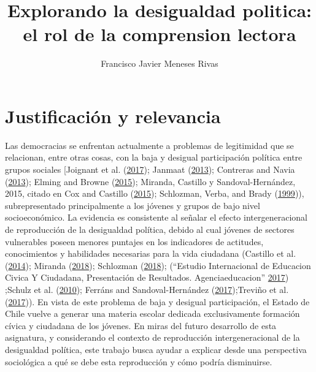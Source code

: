 \documentclass[
]{article}
\title{Explorando la desigualdad politica: el rol de la comprension lectora}
\author{Francisco Javier Meneses Rivas}
\date{}
\begin{document}
\maketitle

\hypertarget{justificaciuxf3n-y-relevancia}{%
\section{Justificación y
relevancia}\label{justificaciuxf3n-y-relevancia}}

Las democracias se enfrentan actualmente a problemas de legitimidad que
se relacionan, entre otras cosas, con la baja y desigual participación
política entre grupos sociales {[}Joignant et al.
(\protect\hyperlink{ref-joignantDesigualdadesVozPolitica2017}{2017});
Janmaat (\protect\hyperlink{ref-janmaatCivicCompetences2013}{2013});
Contreras and Navia
(\protect\hyperlink{ref-contrerasDIFERENCIASGENERACIONALESPARTICIPACION2013}{2013});
Elming and Browne
(\protect\hyperlink{ref-elmingEffectCoalitionTax2015}{2015}); Miranda,
Castillo y Sandoval-Hernández, 2015, citado en Cox and Castillo
(\protect\hyperlink{ref-coxAprendizajeCiudadaniaContextos2015}{2015});
Schlozman, Verba, and Brady
(\protect\hyperlink{ref-Schlozman1999}{1999})), subrepresentado
principalmente a los jóvenes y grupos de bajo nivel socioeconómico. La
evidencia es consistente al señalar el efecto intergeneracional de
reproducción de la desigualdad política, debido al cual jóvenes de
sectores vulnerables poseen menores puntajes en los indicadores de
actitudes, conocimientos y habilidades necesarias para la vida ciudadana
(Castillo et al.
(\protect\hyperlink{ref-castilloSocialInequalityChanges2014}{2014});
Miranda
(\protect\hyperlink{ref-mirandaDesigualdadCiudadaniaAproximacion2018}{2018});
Schlozman
(\protect\hyperlink{ref-schlozmanUnequalUnrepresentedPolitical2018}{2018});
(``Estudio Internacional de Educacion Civica Y Ciudadana, Presentación
de Resultados. Agenciaeducacion''
\protect\hyperlink{ref-EstudioInternacionalEducacion2017}{2017}) ;Schulz
et al. (\protect\hyperlink{ref-informeiccs2011}{2010}); Ferráns and
Sandoval-Hernández
(\protect\hyperlink{ref-ferransCivicCompetenceGaps2017}{2017});Treviño
et al.
(\protect\hyperlink{ref-trevinoInfluenceTeachersSchools2017}{2017})). En
vista de este problema de baja y desigual participación, el Estado de
Chile vuelve a generar una materia escolar dedicada exclusivamente
formación cívica y ciudadana de los jóvenes. En miras del futuro
desarrollo de esta asignatura, y considerando el contexto de
reproducción intergeneracional de la desigualdad política, este trabajo
busca ayudar a explicar desde una perspectiva sociológica a qué se debe
esta reproducción y cómo podría disminuirse.
\end{document}
